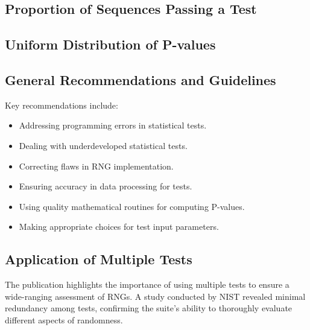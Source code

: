 \documentclass[12pt,openany]{book}
\theoremstyle{definition}
\begin{document}
	\subsection{Proportion of Sequences Passing a Test}
%

	\subsection{Uniform Distribution of P-values}
	
	\subsection{General Recommendations and Guidelines}
	Key recommendations include:
	\begin{itemize}
		\item Addressing programming errors in statistical tests.
		\item Dealing with underdeveloped statistical tests.
		\item Correcting flaws in RNG implementation.
		\item Ensuring accuracy in data processing for tests.
		\item Using quality mathematical routines for computing P-values.
		\item Making appropriate choices for test input parameters.
	\end{itemize}
	
	\subsection{Application of Multiple Tests}
	The publication highlights the importance of using multiple tests to ensure a wide-ranging assessment of RNGs. A study conducted by NIST revealed minimal redundancy among tests, confirming the suite's ability to thoroughly evaluate different aspects of randomness.
	
\end{document}
